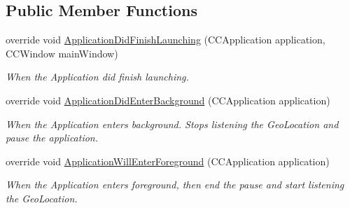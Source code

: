 \subsection*{Public Member Functions}
\begin{DoxyCompactItemize}
\item 
override void \hyperlink{classClient_1_1Common_1_1GameAppDelegate_aacda9c043b12acf24de4bc13a688f52e}{Application\+Did\+Finish\+Launching} (C\+C\+Application application, C\+C\+Window main\+Window)
\begin{DoxyCompactList}\small\item\em When the Application did finish launching. \end{DoxyCompactList}\item 
override void \hyperlink{classClient_1_1Common_1_1GameAppDelegate_a524d489c10652931d4ea5159a34a72e5}{Application\+Did\+Enter\+Background} (C\+C\+Application application)
\begin{DoxyCompactList}\small\item\em When the Application enters background. Stops listening the Geo\+Location and pause the application. \end{DoxyCompactList}\item 
override void \hyperlink{classClient_1_1Common_1_1GameAppDelegate_ad2625495e6b5a1c5853acde2ace6eccb}{Application\+Will\+Enter\+Foreground} (C\+C\+Application application)
\begin{DoxyCompactList}\small\item\em When the Application enters foreground, then end the pause and start listening the Geo\+Location. \end{DoxyCompactList}\end{DoxyCompactItemize}
